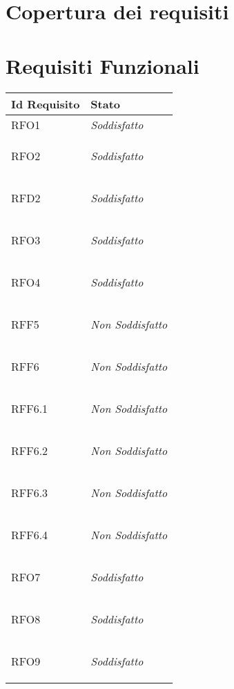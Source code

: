 \section{Copertura dei requisiti}
\section{Requisiti Funzionali}
\normalsize
\begin{longtable}{|>{\centering}m{5cm}|m{5cm}<{\centering}|}
    \hline
    \textbf{Id Requisito} & \textbf{Stato}\\
    \hline
    \endhead
    \hypertarget{RFO1}{RFO1} & \textit{Soddisfatto}\\ \hline
   
    \hypertarget{RFO2}{RFO2} & \textit{Soddisfatto}\\ \hline
   
    \hypertarget{RFD2}{RFD2} & \textit{Soddisfatto}\\ \hline
   
    \hypertarget{RFO3}{RFO3} & \textit{Soddisfatto}\\ \hline
   
    \hypertarget{RFO4}{RFO4} & \textit{Soddisfatto}\\ \hline
   
    \hypertarget{RFF5}{RFF5} & \textit{Non Soddisfatto}\\ \hline
   
    \hypertarget{RFF6}{RFF6} & \textit{Non Soddisfatto}\\ \hline
   
    \hypertarget{RFF6.1}{RFF6.1} & \textit{Non Soddisfatto}\\ \hline
   
    \hypertarget{RFF6.2}{RFF6.2} & \textit{Non Soddisfatto}\\ \hline
   
    \hypertarget{RFF6.3}{RFF6.3} & \textit{Non Soddisfatto}\\ \hline
   
    \hypertarget{RFF6.4}{RFF6.4} & \textit{Non Soddisfatto}\\ \hline
   
    \hypertarget{RFO7}{RFO7} & \textit{Soddisfatto}\\ \hline
   
    \hypertarget{RFO8}{RFO8} & \textit{Soddisfatto}\\ \hline
   
    \hypertarget{RFO9}{RFO9} & \textit{Soddisfatto}\\ \hline
   

\end{longtable}
